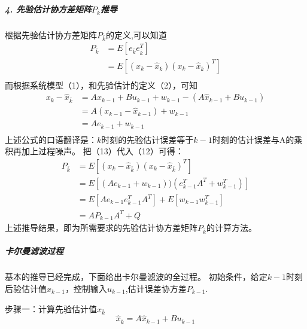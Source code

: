 \documentclass[UTF8,a4paper,10pt]{ctexart}
\begin{document}
    \subparagraph{4. 先验估计协方差矩阵$P_{\bar{k}}$推导}
        根据先验估计协方差矩阵$P_{\bar{k}}$的定义,可以知道
        \begin{equation}
            \begin{aligned}
                P_{\bar{k}} &= E[e_{\bar{k}}e^T_{\bar{k}}]\\
                            &= E[(x_k - \hat{x}_{\bar{k}}) (x_k - \hat{x}_{\bar{k}})^T]\\
            \end{aligned}
        \end{equation}
    而根据系统模型（1），和先验估计的定义（2），可知
    \begin{equation}
        \begin{aligned}
            x_k - \hat{x}_{\bar{k}} &= Ax_{k-1}+Bu_{k-1} + w_{k-1} - (A\hat{x}_{k-1} + Bu_{k-1})\\
                                    &= A(x_{k-1} -\hat{x}_{k-1}) + w_{k-1}\\
                                    &= Ae_{k-1}+ w_{k-1}\\
        \end{aligned}
    \end{equation}
    上述公式的口语翻译是：$k$时刻的先验估计误差等于$k-1$时刻的估计误差与A的乘积再加上过程噪声。
    把（13）代入（12）可得：
    \begin{equation}
        \begin{aligned}
            P_{\bar{k}} &= E[(x_k - \hat{x}_{\bar{k}}) (x_k - \hat{x}_{\bar{k}})^T]\\
                        &= E[(Ae_{k-1}+ w_{k-1}))(e^T_{k-1}A^T+ w^T_{k-1})]\\
                        &= E[Ae_{k-1}e^T_{k-1}A^T] + E[w_{k-1}w_{k-1}^T]\\
                        &= AP_{k-1}A^T + Q
        \end{aligned}
    \end{equation}
    上述推导结果，即为所需要求的先验估计协方差矩阵$P_{\bar{k}}$的计算方法。

    \subparagraph{卡尔曼滤波过程}
    基本的推导已经完成，下面给出卡尔曼滤波的全过程。
    初始条件，给定$k-1$时刻后验估计值$\hat{x}_{k-1}$，控制输入$u_{k-1}$,估计误差协方差$P_{k-1}$.

    步骤一：计算先验估计值$\hat{x}_{\bar{k}}$
    \begin{equation}
        \hat{x}_{\bar{k}} = A\hat{x}_{k-1} + Bu_{k-1}
    \end{equation}
\end{document}

